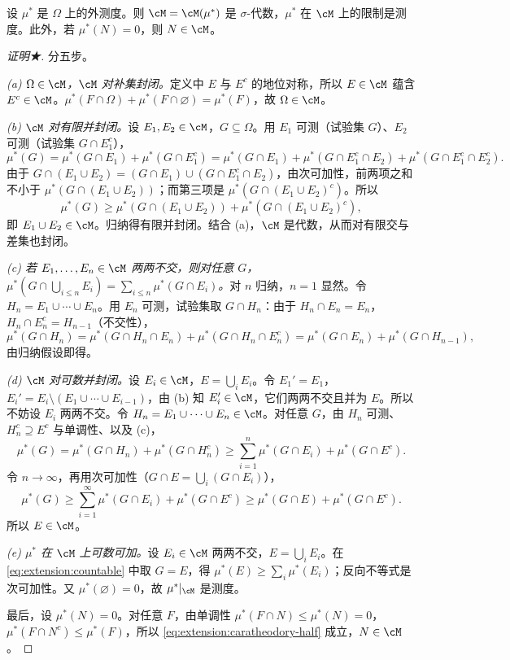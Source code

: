 \begin{theorem}[Carathéodory 定理]\label{thm:extension:caratheodory}
设 $\mu^*$ 是 $\Omega$ 上的外测度。则 $\cM=\cM(\mu^*)$ 是 $\sigma$-代数，$\mu^*$ 在 $\cM$ 上的限制是测度。此外，若 $\mu^*(N)=0$，则 $N\in\cM$。
\end{theorem}
\begin{proof}[证明★]
分五步。

\emph{(a) $\Omega\in\cM$，$\cM$ 对补集封闭。}定义中 $E$ 与 $E^c$ 的地位对称，所以 $E\in\cM$ 蕴含 $E^c\in\cM$。$\mu^*(F\cap\Omega)+\mu^*(F\cap\varnothing)=\mu^*(F)$，故 $\Omega\in\cM$。

\emph{(b) $\cM$ 对有限并封闭。}设 $E_1,E_2\in\cM$，$G\subseteq\Omega$。用 $E_1$ 可测（试验集 $G$）、$E_2$ 可测（试验集 $G\cap E_1^c$），
\[
\mu^*(G)=\mu^*(G\cap E_1)+\mu^*(G\cap E_1^c)=\mu^*(G\cap E_1)+\mu^*(G\cap E_1^c\cap E_2)+\mu^*(G\cap E_1^c\cap E_2^c).
\]
由于 $G\cap(E_1\cup E_2)=(G\cap E_1)\cup(G\cap E_1^c\cap E_2)$，由次可加性，前两项之和不小于 $\mu^*(G\cap(E_1\cup E_2))$；而第三项是 $\mu^*(G\cap(E_1\cup E_2)^c)$。所以
\[
\mu^*(G)\geqslant\mu^*(G\cap(E_1\cup E_2))+\mu^*(G\cap(E_1\cup E_2)^c),
\]
即 $E_1\cup E_2\in\cM$。归纳得有限并封闭。结合 (a)，$\cM$ 是代数，从而对有限交与差集也封闭。

\emph{(c) 若 $E_1,\dots,E_n\in\cM$ 两两不交，则对任意 $G$，$\mu^*(G\cap\bigcup_{i\leqslant n}E_i)=\sum_{i\leqslant n}\mu^*(G\cap E_i)$。}对 $n$ 归纳，$n=1$ 显然。令 $H_n=E_1\cup\cdots\cup E_n$。用 $E_n$ 可测，试验集取 $G\cap H_n$：由于 $H_n\cap E_n=E_n$，$H_n\cap E_n^c=H_{n-1}$（不交性），
\[
\mu^*(G\cap H_n)=\mu^*(G\cap H_n\cap E_n)+\mu^*(G\cap H_n\cap E_n^c)=\mu^*(G\cap E_n)+\mu^*(G\cap H_{n-1}),
\]
由归纳假设即得。

\emph{(d) $\cM$ 对可数并封闭。}设 $E_i\in\cM$，$E=\bigcup_iE_i$。令 $E_1'=E_1$，$E_i'=E_i\setminus(E_1\cup\cdots\cup E_{i-1})$，由 (b) 知 $E_i'\in\cM$，它们两两不交且并为 $E$。所以不妨设 $E_i$ 两两不交。令 $H_n=E_1\cup\cdots\cup E_n\in\cM$。对任意 $G$，由 $H_n$ 可测、$H_n^c\supseteq E^c$ 与单调性、以及 (c)，
\[
\mu^*(G)=\mu^*(G\cap H_n)+\mu^*(G\cap H_n^c)\geqslant\sum_{i=1}^n\mu^*(G\cap E_i)+\mu^*(G\cap E^c).
\]
令 $n\to\infty$，再用次可加性（$G\cap E=\bigcup_i(G\cap E_i)$），
\begin{equation}\label{eq:extension:countable}
\mu^*(G)\geqslant\sum_{i=1}^\infty\mu^*(G\cap E_i)+\mu^*(G\cap E^c)\geqslant\mu^*(G\cap E)+\mu^*(G\cap E^c).
\end{equation}
所以 $E\in\cM$。

\emph{(e) $\mu^*$ 在 $\cM$ 上可数可加。}设 $E_i\in\cM$ 两两不交，$E=\bigcup_iE_i$。在 \eqref{eq:extension:countable} 中取 $G=E$，得 $\mu^*(E)\geqslant\sum_i\mu^*(E_i)$；反向不等式是次可加性。又 $\mu^*(\varnothing)=0$，故 $\mu^*|_\cM$ 是测度。

最后，设 $\mu^*(N)=0$。对任意 $F$，由单调性 $\mu^*(F\cap N)\leqslant\mu^*(N)=0$，$\mu^*(F\cap N^c)\leqslant\mu^*(F)$，所以 \eqref{eq:extension:caratheodory-half} 成立，$N\in\cM$。
\end{proof}

